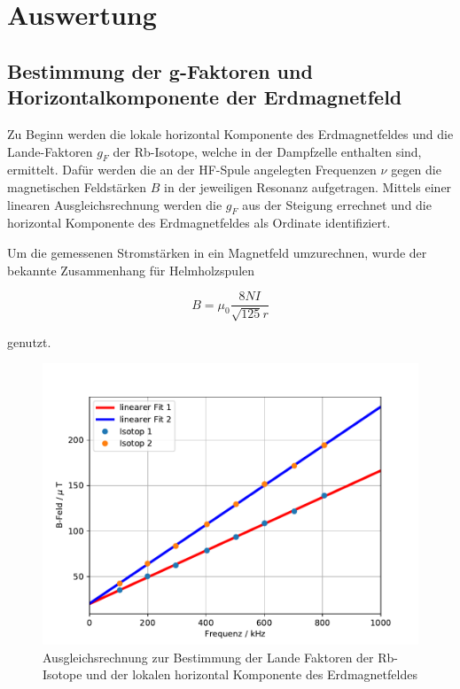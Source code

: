 \section{Auswertung}
\subsection{Bestimmung der g-Faktoren und Horizontalkomponente der Erdmagnetfeld}
Zu Beginn werden die lokale horizontal Komponente des Erdmagnetfeldes und die Lande-Faktoren $g_F$ der Rb-Isotope, welche in der Dampfzelle enthalten sind, ermittelt.
Dafür werden die an der HF-Spule angelegten Frequenzen $\nu$ gegen die magnetischen Feldstärken $B$ in der jeweiligen Resonanz aufgetragen. Mittels einer linearen Ausgleichsrechnung werden die $g_F$ aus der Steigung errechnet und die horizontal Komponente des Erdmagnetfeldes als Ordinate identifiziert.

Um die gemessenen Stromstärken in ein Magnetfeld umzurechnen, wurde der bekannte Zusammenhang für Helmholzspulen

\begin{equation}
B = \mu_0 \frac{8NI}{\sqrt{125} r}
\end{equation}

genutzt.

\begin{figure}[h]
\centering
\includegraphics[scale=0.8]{img/plotLande.pdf}
\caption{Ausgleichsrechnung zur Bestimmung der Lande Faktoren der Rb-Isotope und der lokalen horizontal Komponente des Erdmagnetfeldes}
\label{aufbau}
\end{figure}

